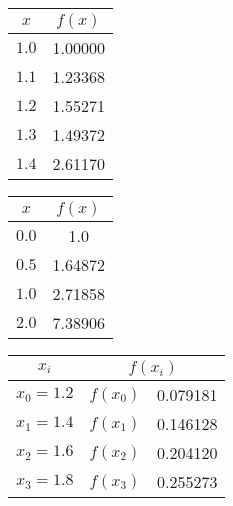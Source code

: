 \documentclass[12pt,class=book,crop=false]{standalone}
\begin{document}
\begin{center}
    \begin{tabular}{cS[table-format=3.5]}
        \toprule
        \(  x \)   &  \\\midrule
        \(  1.0 \) & 1.00000                         \\
        \(  1.1 \) & 1.23368                         \\
        \(  1.2 \) & 1.55271                         \\
        \(  1.3 \) & 1.49372                         \\
        \(  1.4 \) & 2.61170                         \\\bottomrule
    \end{tabular}
\end{center}
\begin{center}
    \begin{tabular}{cS[table-format=3.5]}
        \toprule
        \(  x \)   &  \\\midrule
        \(  0.0 \) & 1.0                             \\
        \(  0.5 \) & 1.64872                         \\
        \(  1.0 \) & 2.71858                         \\
        \(  2.0 \) & 7.38906                         \\\bottomrule
    \end{tabular}
\end{center}
\begin{center}
    \begin{tabular}{cr@{ = }S[table-format=2.6]}
        \toprule
        \(  x_i \)     &             \\\midrule
        \(  x_0=1.2 \) & \(  f(x_0)\)                      & 0.079181 \\
        \(  x_1=1.4 \) & \(  f(x_1)\)                      & 0.146128 \\
        \(  x_2=1.6 \) & \(  f(x_2)\)                      & 0.204120 \\
        \(  x_3=1.8 \) & \(  f(x_3)\)                      & 0.255273 \\\bottomrule
    \end{tabular}
\end{center}
\end{document}
